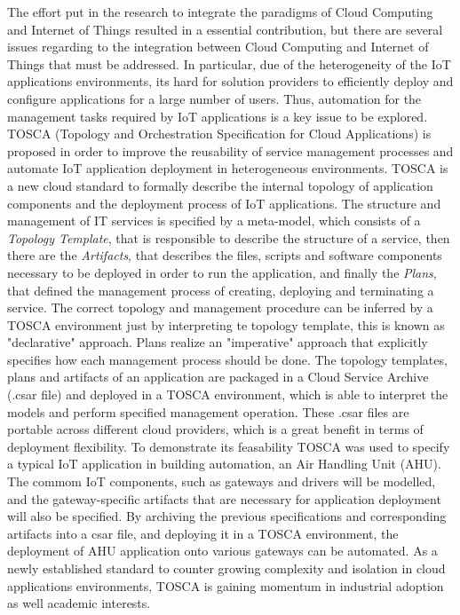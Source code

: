 The effort put in the research to integrate the paradigms of Cloud Computing and Internet of Things resulted in a essential contribution, but there are several
issues regarding to the integration between Cloud Computing and Internet of Things that must be addressed. In particular, due of the heterogeneity of the IoT
applications environments, its hard for solution providers to efficiently deploy and configure applications for a large number of users. Thus, automation for
the management tasks required by IoT applications is a key issue to be explored.\\

TOSCA (Topology and Orchestration Specification for Cloud Applications) \cite{li2013towards} is proposed in order to improve the reusability of service management
processes and automate IoT application deployment in heterogeneous environments. TOSCA is a new cloud standard to formally describe the internal topology of
application components and the deployment process of IoT applications. The structure and management of IT services is specified by a meta-model, which consists
of a \textit{Topology Template}, that is responsible to describe the structure of a service, then there are the \textit{Artifacts}, that describes the files, scripts and
software components necessary to be deployed in order to run the application, and finally the \textit{Plans}, that defined the management process of creating, deploying and
terminating a service. The correct topology and management procedure can be inferred by a TOSCA environment just by interpreting te topology template, this is known
as "declarative" approach. Plans realize an "imperative" approach that explicitly specifies how each management process should be done. The topology templates, plans
and artifacts of an application are packaged in a Cloud Service Archive (.csar file) and deployed in a TOSCA environment, which is able to interpret the models and perform
specified management operation. These .csar files are portable across different cloud providers, which is a great benefit in terms of deployment flexibility.
To demonstrate its feasability TOSCA was used to specify a typical IoT application in building automation, an Air Handling Unit (AHU). The commom IoT components, such as gateways
and drivers will be modelled, and the gateway-specific artifacts that are necessary for application deployment will also be specified. By archiving the previous specifications
and corresponding artifacts into a csar file, and deploying it in a TOSCA environment, the deployment of AHU application onto various gateways can be automated.
As a newly established standard to counter growing complexity and isolation in cloud applications environments, TOSCA is gaining momentum in industrial adoption as well academic interests.\\

